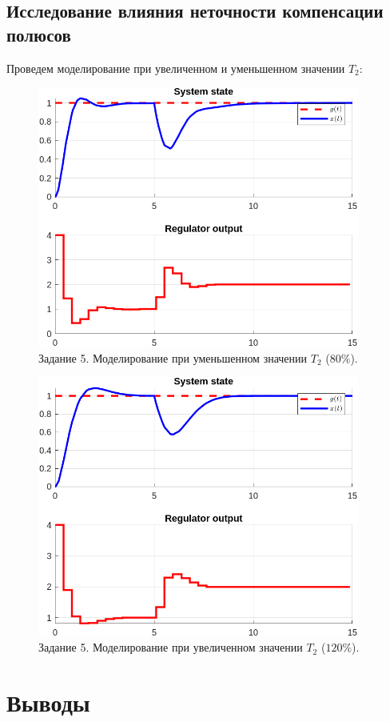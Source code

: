 \documentclass[a4paper, 14pt]{extarticle}
\theoremstyle{definition}
\theoremstyle{plain}
\theoremstyle{remark}
\begin{document}
\subsection{Исследование влияния неточности компенсации полюсов}
Проведем моделирование при увеличенном и уменьшенном значении $T_2$:
\begin{figure}
    [H]
    \centering
    \includegraphics[width=300pt]{images/task5__decreased_state.png}
    \caption{Задание 5. Моделирование при уменьшенном значении $T_2$ ($80\%$).}
    \label{fig:task5__decreased_state}
\end{figure}
\begin{figure}
    [H]
    \centering
    \includegraphics[width=300pt]{images/task5__increased_state.png}
    \caption{Задание 5. Моделирование при увеличенном значении $T_2$ ($120\%$).}
    \label{fig:task5__increased_state}
\end{figure}
\section{Выводы}
\end{document}
